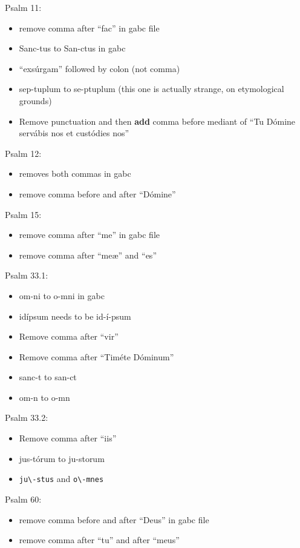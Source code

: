 \documentclass[11pt]{article}
\begin{document}
Psalm 11:
  \begin{itemize}
  \item remove comma after ``fac'' in gabc file 
  \item  Sanc-tus to San-ctus in gabc
\item ``exsúrgam'' followed by colon (not comma)
\item
sep-tuplum to se-ptuplum (this one is actually strange, on etymological grounds)
\item
Remove punctuation and then \textbf{add} comma before mediant of ``Tu Dómine servábis nos et custódies nos''
    \end{itemize}

Psalm 12:
  \begin{itemize}
  \item removes both commas in gabc
  \item  remove comma before and after ``Dómine''
    \end{itemize}

Psalm 15:
  \begin{itemize}
  \item remove comma after ``me'' in gabc file
  \item  remove comma after ``meæ'' and ``es''
    \end{itemize}

Psalm 33.1:
  \begin{itemize}
  \item om-ni to o-mni in gabc
  \item idípsum needs to be id-í-psum
    \item
  Remove comma after ``vir''
  \item
  Remove comma after ``Timéte Dóminum''
  \item
  sanc-t to san-ct
  \item
  om-n to o-mn
    \end{itemize}

Psalm 33.2:
  \begin{itemize}
    \item
  Remove comma after ``iis''
  \item
  jus-tórum to ju-storum
  \item  \verb|ju\-stus| and \verb|o\-mnes|
    \end{itemize}

Psalm 60:
  \begin{itemize}
  \item remove comma before and after ``Deus'' in gabc file
  \item  remove comma after ``tu'' and after ``meus''
    \end{itemize}
\end{document}
